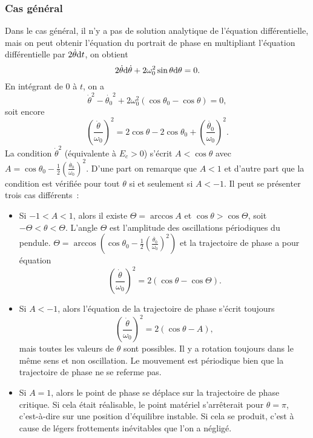 \subsubsection{Cas général}%
%
Dans le cas général, il n'y a pas de solution analytique de l'équation 
différentielle, mais on peut obtenir l'équation du portrait de phase en 
multipliant l'équation différentielle par \(2\dot{\theta} \mathrm{d} t\), on obtient
\begin{equation}%
  2\dot{\theta} \D \dot{\theta} + 2\omega_0^2\sin\theta \D \theta=0.
\end{equation}%
En intégrant de \(0\) à \(t\), on a
\begin{equation}%
  \dot{\theta}^2-\dot{\theta_0}^2+2\omega_0^2(\cos\theta_0 - \cos\theta)=0,
\end{equation}%
soit encore
\begin{equation}%
  \left(\frac{\dot{\theta}}{\omega_0}\right)^2 = 2\cos\theta - 2\cos\theta_0 + 
  \left(\frac{\dot{\theta_0}}{\omega_0}\right)^2.
\end{equation}%
%
La condition \(\dot\theta^2\) (équivalente à \(E_c>0\)) s'écrit 
\(A<\cos\theta\) avec \(A=\cos\theta_0 - 
\frac{1}{2}\left(\frac{\dot{\theta_0}}{\omega_0}\right)^2\). D'une part on 
remarque que \(A<1\) et d'autre part que la condition est vérifiée pour tout 
\(\theta\) si et seulement si \(A<-1\). Il peut se présenter trois cas 
différents~:
\begin{itemize}%
\item Si \(-1 < A < 1\), alors il existe \(\Theta=\arccos A\) et 
  \(\cos\theta>\cos\Theta\), soit \(-\Theta < \theta < \Theta\). L'angle 
    \(\Theta\) est l'amplitude des oscillations périodiques du pendule. 
    \(\Theta = \arccos\left(\cos\theta_0 - 
    \frac{1}{2}\left(\frac{\dot{\theta_0}}{\omega_0}\right)^2\right)\) et la 
    trajectoire de phase a pour équation
  \begin{equation}
    \left(\frac{\dot{\theta}}{\omega_0}\right)^2 = 2(\cos\theta - \cos\Theta).
  \end{equation}
\item Si \(A < -1\), alors l'équation de la trajectoire de phase s'écrit 
  toujours
  \begin{equation}
    \left(\frac{\dot{\theta}}{\omega_0}\right)^2 = 2(\cos\theta - A),
  \end{equation}
  mais toutes les valeurs de \(\theta\) sont possibles. Il y a rotation 
    toujours dans le même sens et non oscillation. Le mouvement est périodique 
    bien que la trajectoire de phase ne se referme pas.
\item Si \(A = 1\), alors le point de phase se déplace sur la trajectoire de 
  phase critique. Si cela était réalisable, le point matériel s'arrêterait pour 
    \(\theta=\pi\), c'est-à-dire sur une position d'équilibre instable. Si cela 
    se produit, c'est à cause de légers frottements inévitables que l'on a 
    négligé.
\end{itemize}%
%
